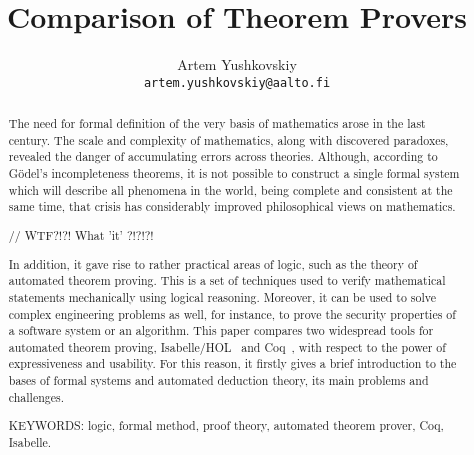 \documentclass[article]{aaltoseries}
\begin{document}


\title{Comparison of Theorem Provers}

\author{Artem Yushkovskiy
\\\textnormal{\texttt{artem.yushkovskiy@aalto.fi}}}


\maketitle



\begin{abstract}

The need for formal definition of the very basis of mathematics arose in the last century.
The scale and complexity of mathematics, along with discovered paradoxes, revealed the danger of accumulating errors across theories. Although, according to Gödel's incompleteness theorems, it is not possible to construct a single formal system which will describe all phenomena in the world, being complete and consistent at the same time, that crisis has considerably improved philosophical views on mathematics. 

// WTF?!?! What 'it' ?!?!?!

In addition, it gave rise to rather practical areas of logic, such as the theory of automated theorem proving. This is a set of techniques used to verify mathematical statements mechanically using logical reasoning. Moreover, it can be used to solve complex engineering problems as well, for instance, to prove the security properties of a software system or an algorithm.
This paper compares two widespread tools for automated theorem proving,  Isabelle/HOL~\cite{tool_Isabelle} and Coq~\cite{tool_Coq}, with respect to the power of expressiveness and usability. For this reason, it firstly gives a brief introduction to the bases of formal systems and automated deduction theory, its main problems and challenges.

\vspace{3mm}
\noindent KEYWORDS: logic, formal method, proof theory, automated theorem prover, Coq, Isabelle.
	
\end{abstract}

\end{document}
